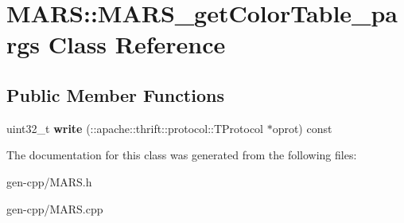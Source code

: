 \hypertarget{classMARS_1_1MARS__getColorTable__pargs}{}\section{M\+A\+RS\+:\+:M\+A\+R\+S\+\_\+get\+Color\+Table\+\_\+pargs Class Reference}
\label{classMARS_1_1MARS__getColorTable__pargs}
\subsection*{Public Member Functions}
\begin{DoxyCompactItemize}
\item 
\mbox{\label{classMARS_1_1MARS__getColorTable__pargs_a91f473e60c3af3f843d1de77bab011cc}} 
uint32\+\_\+t {\bfseries write} (\+::apache\+::thrift\+::protocol\+::\+T\+Protocol $\ast$oprot) const
\end{DoxyCompactItemize}


The documentation for this class was generated from the following files\+:\begin{DoxyCompactItemize}
\item 
gen-\/cpp/M\+A\+R\+S.\+h\item 
gen-\/cpp/M\+A\+R\+S.\+cpp\end{DoxyCompactItemize}

